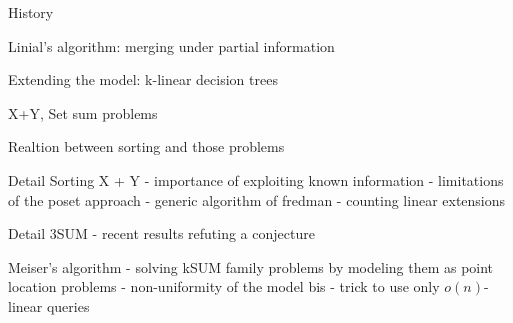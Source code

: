 History

Linial's algorithm: merging under partial information

Extending the model: k-linear decision trees

X+Y, Set sum problems

Realtion between sorting and those problems

Detail Sorting X + Y
- importance of exploiting known information
- limitations of the poset approach
- generic algorithm of fredman
- counting linear extensions

Detail 3SUM
- recent results refuting a conjecture

Meiser's algorithm
- solving kSUM family problems by modeling them as point location problems
- non-uniformity of the model bis
- trick to use only \(o(n)\)-linear queries

